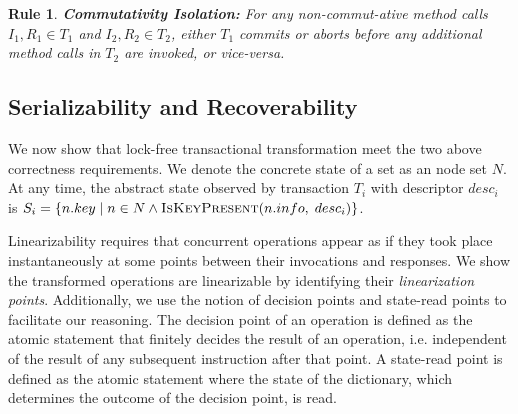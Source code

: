 \documentclass[]{sig-alternate-05-2015}
\newtheorem{crule}{Rule}
\begin{document}
\begin{crule}
    \textbf{Commutativity Isolation:} For any non-commut-ative method calls $I_1,R_1 \in T_1$ and $I_2,R_2 \in T_2$, either $T_1$ commits or aborts before any additional method calls in $T_2$ are invoked, or vice-versa.
\end{crule}


\subsection{Serializability and Recoverability}
We now show that lock-free transactional transformation meet the two above correctness requirements. 
We denote the concrete state of a set as an node set $N$.
At any time, the abstract state observed by transaction $T_i$ with descriptor $desc_i$ is $S_i = \{n.key\;|\;n \in N \land \textsc{IsKeyPresent}(n.info,\;desc_i)\}$.

Linearizability requires that concurrent operations appear as if they took place instantaneously at some points between their invocations and responses.
We show the transformed operations are linearizable by identifying their \emph{linearization points}.
Additionally, we use the notion of decision points and state-read points to facilitate our reasoning. 
The decision point of an operation is defined as the atomic statement that finitely decides the result of an operation, i.e. independent of the result of any subsequent instruction after that point.
A state-read point is defined as the atomic statement where the state of the dictionary, which determines the outcome of the decision point, is read.
\end{document}
